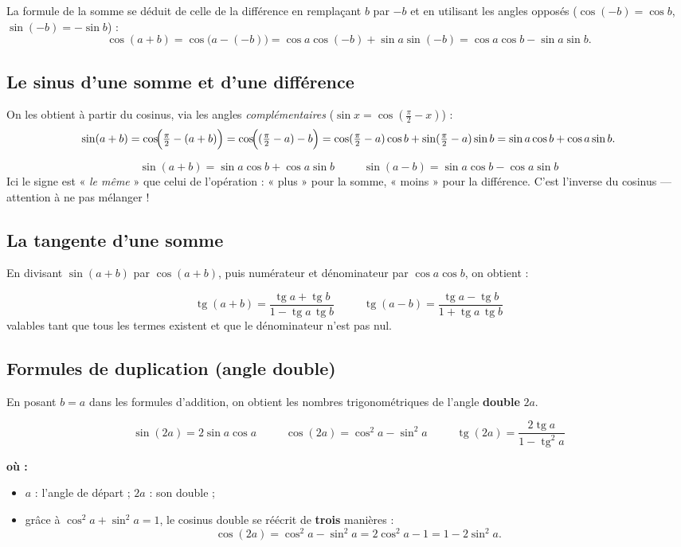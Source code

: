 \documentclass[11pt,a4paper]{article}
\newenvironment{ou}{%
  \par\smallskip\noindent\textbf{où :}\nopagebreak
  \begin{itemize}[leftmargin=1.8em,topsep=2pt,itemsep=1.5pt,parsep=0pt]}%
  {\end{itemize}}
\DeclareMathOperator{\tg}{tg}        %
\begin{document}
\begin{remarque}
La formule de la somme se déduit de celle de la différence en remplaçant $b$ par $-b$ et en utilisant
les angles opposés ($\cos(-b)=\cos b$, $\sin(-b)=-\sin b$) :
\[
\cos(a+b)=\cos\bigl(a-(-b)\bigr)=\cos a\cos(-b)+\sin a\sin(-b)=\cos a\cos b-\sin a\sin b.
\]
\end{remarque}

\subsection{Le sinus d'une somme et d'une différence}
On les obtient à partir du cosinus, via les angles \emph{complémentaires}
($\sin x=\cos(\tfrac{\pi}{2}-x)$) :
\[
\sin(a+b)=\cos\!\Bigl(\tfrac{\pi}{2}-(a+b)\Bigr)=\cos\!\Bigl((\tfrac{\pi}{2}-a)-b\Bigr)
=\cos(\tfrac{\pi}{2}-a)\cos b+\sin(\tfrac{\pi}{2}-a)\sin b=\sin a\cos b+\cos a\sin b.
\]

\begin{formule}
\[
\boxed{\;\sin(a+b)=\sin a\cos b+\cos a\sin b\;}
\qquad
\boxed{\;\sin(a-b)=\sin a\cos b-\cos a\sin b\;}
\]
Ici le signe est « \emph{le même} » que celui de l'opération : « plus » pour la somme, « moins »
pour la différence. C'est l'inverse du cosinus --- attention à ne pas mélanger !
\end{formule}

\subsection{La tangente d'une somme}
En divisant $\sin(a+b)$ par $\cos(a+b)$, puis numérateur et dénominateur par $\cos a\cos b$, on obtient :

\begin{formule}
\[
\boxed{\;\tg(a+b)=\frac{\tg a+\tg b}{1-\tg a\,\tg b}\;}
\qquad
\boxed{\;\tg(a-b)=\frac{\tg a-\tg b}{1+\tg a\,\tg b}\;}
\]
valables tant que tous les termes existent et que le dénominateur n'est pas nul.
\end{formule}

\subsection{Formules de duplication (angle double)}
En posant $b=a$ dans les formules d'addition, on obtient les nombres trigonométriques de l'angle
\textbf{double} $2a$.

\begin{formule}
\[
\boxed{\;\sin(2a)=2\sin a\cos a\;}
\qquad
\boxed{\;\cos(2a)=\cos^2a-\sin^2a\;}
\qquad
\boxed{\;\tg(2a)=\frac{2\tg a}{1-\tg^2a}\;}
\]
\begin{ou}
  \item $a$ : l'angle de départ ; $2a$ : son double ;
  \item grâce à $\cos^2a+\sin^2a=1$, le cosinus double se réécrit de \textbf{trois} manières :
  \[
  \cos(2a)=\cos^2a-\sin^2a=2\cos^2a-1=1-2\sin^2a.
  \]
\end{ou}
\end{formule}
\end{document}
